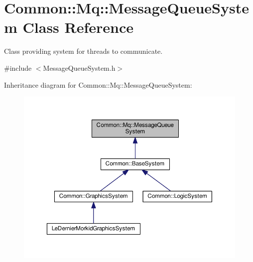 \hypertarget{class_common_1_1_mq_1_1_message_queue_system}{}\section{Common\+:\+:Mq\+:\+:Message\+Queue\+System Class Reference}
\label{class_common_1_1_mq_1_1_message_queue_system}


Class providing system for threads to communicate.  




{\ttfamily \#include $<$Message\+Queue\+System.\+h$>$}



Inheritance diagram for Common\+:\+:Mq\+:\+:Message\+Queue\+System\+:\nopagebreak
\begin{figure}[H]
\begin{center}
\leavevmode
\includegraphics[width=350pt]{class_common_1_1_mq_1_1_message_queue_system__inherit__graph}
\end{center}
\end{figure}
